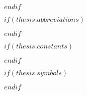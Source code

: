 \dedicatory{}
$endif$

\begingroup
\hypersetup{linkcolor=$if(toclinkcolor)$$toclinkcolor$$else$black$endif$}

\tableofcontents %
\listoffigures %
\listoftables %

\endgroup

$if(thesis.abbreviations)$


$endif$

$if(thesis.constants)$


$endif$

$if(thesis.symbols)$


$endif$


\mainmatter %
\pagestyle{thesis} %
